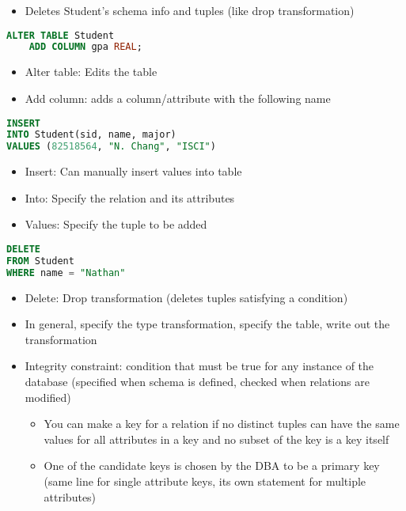 \documentclass[8pt,landscape,a4paper, fleqn, dvipsnames]{extarticle}
\begin{document}
\begin{multicols*}{4}
\begin{itemize}
    \item Deletes Student's schema info and tuples (like drop transformation)
\end{itemize}
\begin{lstlisting}[language = SQL]
ALTER TABLE Student
    ADD COLUMN gpa REAL;
\end{lstlisting}
\begin{itemize}
    \item Alter table: Edits the table
    \item Add column: adds a column/attribute with the following name
\end{itemize}
\begin{lstlisting}[language = SQL]
INSERT
INTO Student(sid, name, major)
VALUES (82518564, "N. Chang", "ISCI")
\end{lstlisting}
\begin{itemize}
    \item Insert: Can manually insert values into table
    \item Into: Specify the relation and its attributes
    \item Values: Specify the tuple to be added
\end{itemize}
\begin{lstlisting}[language = SQL]
DELETE
FROM Student
WHERE name = "Nathan"
\end{lstlisting}
\begin{itemize}
    \item Delete: Drop transformation (deletes tuples satisfying a condition)
\end{itemize}
\begin{itemize}
    \item In general, specify the type transformation, specify the table, write out the transformation
    \item Integrity constraint: condition that must be true for any instance of the database (specified when schema is defined, checked when relations are modified)
    \begin{itemize}
        \item You can make a key for a relation if no distinct tuples can have the same values for all attributes in a key and no subset of the key is a key itself
        \item One of the candidate keys is chosen by the DBA to be a primary key (same line for single attribute keys, its own statement for multiple attributes)
    \end{itemize}

\end{itemize}
\end{multicols*}
\end{document}
